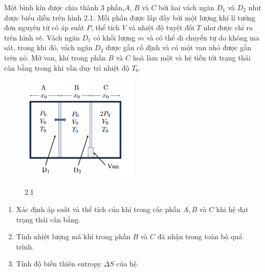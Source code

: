 \noindent Một bình kín được chia thành 3 phần,$A$, $B$ và $C$ bởi hai vách ngăn $D_1$ và $D_2$ như được biểu diễn trên hình 2.1. Mỗi phần được lấp đầy bởi một lượng khí lí tưởng đơn nguyên tử có áp suất $P$, thể tích $V$ và nhiệt độ tuyệt đối $T$ như được chỉ ra trên hình vẽ. Vách ngăn $D_1$ có khối lượng $m$ và có thể di chuyển tự do không ma sát, trong khi đó, vách ngăn $D_2$ được gắn cố định và có một van nhỏ được gắn trên nó. Mở van, khí trong phần $B$ và $C$ hoà làm một và hệ tiến tới trạng thái cân bằng trong khi vẫn duy trì nhiệt độ $T_0$.
\begin{figure}[h]
  \centering
  \includegraphics[width=0.5\textwidth]{Figures/Problems/Fig 2.1.png}
  \begin{center}
    \figurename{ 2.1}
  \end{center}
\end{figure}

\begin{enumerate}
  \item Xác định áp suất và thể tích của khí trong các phần $A, B$ và $C$ khi hệ đạt trạng thái cân bằng.
  \item Tính nhiệt lượng mà khí trong phần $B$ và $C$ đã nhận trong toàn bộ quá trình.
  \item Tính độ biến thiên entropy $\Delta S$ của hệ.
\end{enumerate}